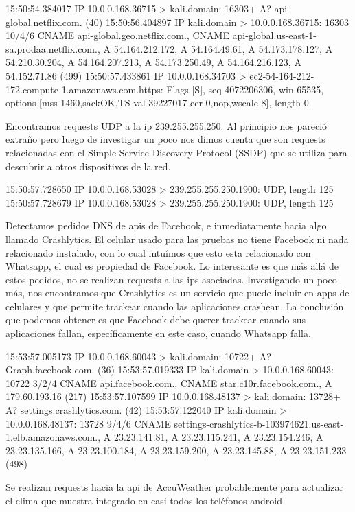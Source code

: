 15:50:54.384017 IP 10.0.0.168.36715 > kali.domain: 16303+ A? api-global.netflix.com. (40)
15:50:56.404897 IP kali.domain > 10.0.0.168.36715: 16303 10/4/6 CNAME api-global.geo.netflix.com., CNAME api-global.us-east-1-sa.prodaa.netflix.com., A 54.164.212.172, A 54.164.49.61, A 54.173.178.127, A 54.210.30.204, A 54.164.207.213, A 54.173.250.49, A 54.164.216.123, A 54.152.71.86 (499)
15:50:57.433861 IP 10.0.0.168.34703 > ec2-54-164-212-172.compute-1.amazonaws.com.https: Flags [S], seq 4072206306, win 65535, options [mss 1460,sackOK,TS val 39227017 ecr 0,nop,wscale 8], length 0

Encontramos requests UDP a la ip 239.255.255.250. Al principio nos pareció extraño pero luego de investigar un poco nos dimos cuenta que son requests relacionadas con el Simple Service Discovery Protocol (SSDP) que se utiliza para descubrir a otros dispositivos de la red.

	15:50:57.728650 IP 10.0.0.168.53028 > 239.255.255.250.1900: UDP, length 125
15:50:57.728679 IP 10.0.0.168.53028 > 239.255.255.250.1900: UDP, length 125

Detectamos pedidos DNS de apis de Facebook, e inmediatamente hacia algo llamado Crashlytics. El celular usado para las pruebas no tiene Facebook ni nada relacionado instalado, con lo cual intuímos que esto esta relacionado con Whatsapp, el cual es propiedad de Facebook. Lo interesante es que más allá de estos pedidos, no se realizan requests a las ips asociadas. Investigando un poco más, nos encontramos que Crashlytics es un servicio que puede incluir en apps de celulares y que permite trackear cuando las aplicaciones crashean. La conclusión que podemos obtener es que Facebook debe querer trackear cuando sus aplicaciones fallan, específicamente en este caso, cuando Whatsapp falla.

15:53:57.005173 IP 10.0.0.168.60043 > kali.domain: 10722+ A? Graph.facebook.com. (36)
15:53:57.019333 IP kali.domain > 10.0.0.168.60043: 10722 3/2/4 CNAME api.facebook.com., CNAME star.c10r.facebook.com., A 179.60.193.16 (217)
15:53:57.107599 IP 10.0.0.168.48137 > kali.domain: 13728+ A? settings.crashlytics.com. (42)
15:53:57.122040 IP kali.domain > 10.0.0.168.48137: 13728 9/4/6 CNAME settings-crashlytics-b-103974621.us-east-1.elb.amazonaws.com., A 23.23.141.81, A 23.23.115.241, A 23.23.154.246, A 23.23.135.166, A 23.23.100.184, A 23.23.159.200, A 23.23.145.88, A 23.23.151.233 (498)

Se realizan requests hacia la api de AccuWeather probablemente para actualizar el clima que muestra integrado en casi todos los teléfonos android

